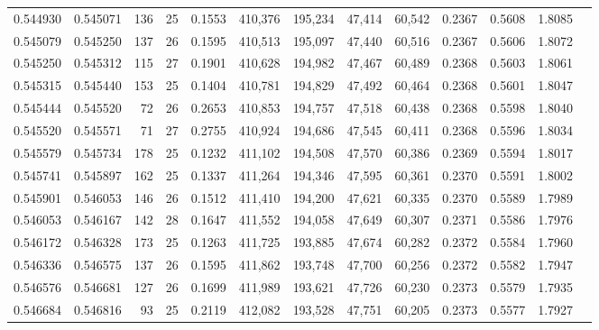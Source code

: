 \begin{tabular}{rrrrrrrrrrrrr}
0.544930 & 0.545071 &   136 &  25 &                                     0.1553 & 410,376 & 195,234 &  47,414 &  60,542 & 0.2367 & 0.5608 & 1.8085 \\
0.545079 & 0.545250 &   137 &  26 &                                     0.1595 & 410,513 & 195,097 &  47,440 &  60,516 & 0.2367 & 0.5606 & 1.8072 \\
0.545250 & 0.545312 &   115 &  27 &                                     0.1901 & 410,628 & 194,982 &  47,467 &  60,489 & 0.2368 & 0.5603 & 1.8061 \\
0.545315 & 0.545440 &   153 &  25 &                                     0.1404 & 410,781 & 194,829 &  47,492 &  60,464 & 0.2368 & 0.5601 & 1.8047 \\
0.545444 & 0.545520 &    72 &  26 &                                     0.2653 & 410,853 & 194,757 &  47,518 &  60,438 & 0.2368 & 0.5598 & 1.8040 \\
0.545520 & 0.545571 &    71 &  27 &                                     0.2755 & 410,924 & 194,686 &  47,545 &  60,411 & 0.2368 & 0.5596 & 1.8034 \\
0.545579 & 0.545734 &   178 &  25 &                                     0.1232 & 411,102 & 194,508 &  47,570 &  60,386 & 0.2369 & 0.5594 & 1.8017 \\
0.545741 & 0.545897 &   162 &  25 &                                     0.1337 & 411,264 & 194,346 &  47,595 &  60,361 & 0.2370 & 0.5591 & 1.8002 \\
0.545901 & 0.546053 &   146 &  26 &                                     0.1512 & 411,410 & 194,200 &  47,621 &  60,335 & 0.2370 & 0.5589 & 1.7989 \\
0.546053 & 0.546167 &   142 &  28 &                                     0.1647 & 411,552 & 194,058 &  47,649 &  60,307 & 0.2371 & 0.5586 & 1.7976 \\
0.546172 & 0.546328 &   173 &  25 &                                     0.1263 & 411,725 & 193,885 &  47,674 &  60,282 & 0.2372 & 0.5584 & 1.7960 \\
0.546336 & 0.546575 &   137 &  26 &                                     0.1595 & 411,862 & 193,748 &  47,700 &  60,256 & 0.2372 & 0.5582 & 1.7947 \\
0.546576 & 0.546681 &   127 &  26 &                                     0.1699 & 411,989 & 193,621 &  47,726 &  60,230 & 0.2373 & 0.5579 & 1.7935 \\
0.546684 & 0.546816 &    93 &  25 &                                     0.2119 & 412,082 & 193,528 &  47,751 &  60,205 & 0.2373 & 0.5577 & 1.7927 \\

\end{tabular}
